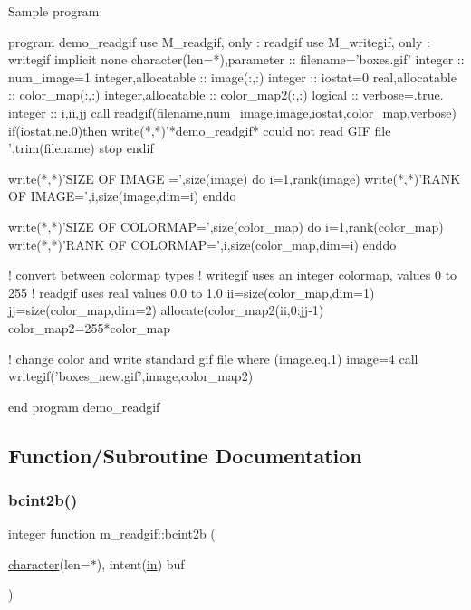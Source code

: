 \begin{DoxyVerb}Sample program:

   program demo_readgif
   use M_readgif, only : readgif
   use M_writegif, only : writegif
   implicit none
   character(len=*),parameter :: filename='boxes.gif'
   integer                    :: num_image=1
   integer,allocatable        :: image(:,:)
   integer                    :: iostat=0
   real,allocatable           :: color_map(:,:)
   integer,allocatable        :: color_map2(:,:)
   logical                    :: verbose=.true.
   integer                    :: i,ii,jj
   call readgif(filename,num_image,image,iostat,color_map,verbose)
   if(iostat.ne.0)then
      write(*,*)'*demo_readgif* could not read GIF file ',trim(filename)
      stop
   endif

   write(*,*)'SIZE OF IMAGE =',size(image)
   do i=1,rank(image)
      write(*,*)'RANK OF IMAGE=',i,size(image,dim=i)
   enddo

   write(*,*)'SIZE OF COLORMAP=',size(color_map)
   do i=1,rank(color_map)
      write(*,*)'RANK OF COLORMAP=',i,size(color_map,dim=i)
   enddo

   ! convert between colormap types
   ! writegif uses an integer colormap, values 0 to 255
   ! readgif  uses real values 0.0 to 1.0
   ii=size(color_map,dim=1)
   jj=size(color_map,dim=2)
   allocate(color_map2(ii,0:jj-1)
   color_map2=255*color_map

   ! change color and write standard gif file
   where (image.eq.1) image=4
   call writegif('boxes_new.gif',image,color_map2)

   end program demo_readgif \end{DoxyVerb}
 

\subsection{Function/\+Subroutine Documentation}
\mbox{\label{namespacem__readgif_a38594ce718f97f844771250edcd5e496}} 
\subsubsection{\texorpdfstring{bcint2b()}{bcint2b()}}
{\footnotesize\ttfamily integer function m\+\_\+readgif\+::bcint2b (\begin{DoxyParamCaption}\item[{\hyperlink{option__stopwatch_83_8txt_abd4b21fbbd175834027b5224bfe97e66}{character}(len=$\ast$), intent(\hyperlink{M__journal_83_8txt_afce72651d1eed785a2132bee863b2f38}{in})}]{buf }\end{DoxyParamCaption})\hspace{0.3cm}{\ttfamily [private]}}

